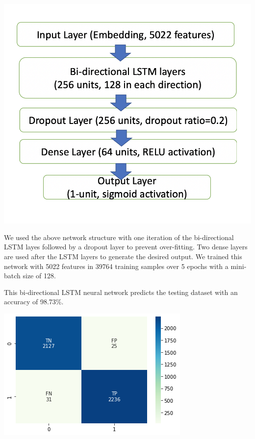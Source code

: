 \documentclass{article}
\begin{document}
\begin{multicols}{2}
\begin{center}
\includegraphics[scale=0.35]{images/img5.png}
\end{center}

We used the above network structure with one iteration of the bi-directional LSTM layes followed by a dropout layer to prevent over-fitting. Two dense layers are used after the LSTM layers to generate the desired output. We trained this network with 5022 features in 39764 training samples over 5 epochs with a mini-batch size of 128.


This bi-directional LSTM neural network predicts the testing dataset with an accuracy of 98.73\%.

\begin{center}
\includegraphics[scale=0.45]{images/lstmcm.png}
\end{center}


\end{multicols}
\end{document}
